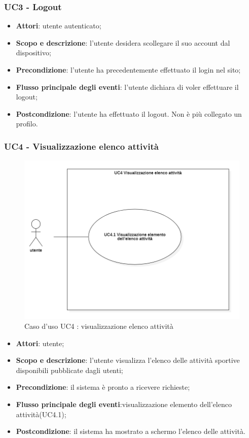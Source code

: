\subsubsection{UC3 - Logout}
\begin{itemize}
\item \textbf{Attori}: utente autenticato;
\item \textbf{Scopo e descrizione}: l’utente desidera scollegare il suo account dal dispositivo;
\item \textbf{Precondizione}: l’utente ha precedentemente effettuato il login nel sito;
\item \textbf{Flusso principale degli eventi}: l’utente dichiara di voler effettuare il logout;
\item \textbf{Postcondizione}: l’utente ha effettuato il logout. Non è più collegato un profilo.
\end{itemize}


\subsubsection{UC4 - Visualizzazione elenco attività}
\begin{figure}[H]
	\centering
	\includegraphics[width=0.8\linewidth]{res/images/UC4.png}
	\caption{Caso d'uso UC4 : visualizzazione elenco attività}
\end{figure}
\begin{itemize}
\item \textbf{Attori}: utente;
\item \textbf{Scopo e descrizione}: l’utente visualizza l'elenco delle attività sportive disponibili pubblicate dagli utenti;
\item \textbf{Precondizione}: il sistema è pronto a ricevere richieste;
\item \textbf{Flusso principale degli eventi}:visualizzazione elemento dell'elenco attività(UC4.1);
\item \textbf{Postcondizione}: il sistema ha mostrato a schermo l'elenco delle attività.
\end{itemize}

